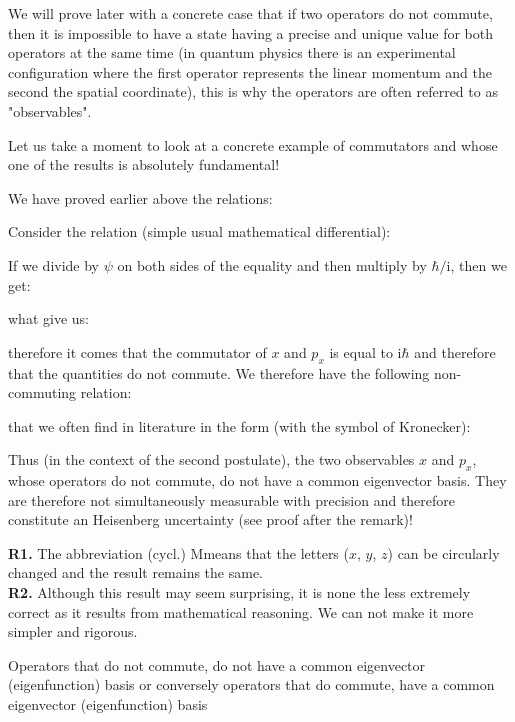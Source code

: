 	We will prove later with a concrete case that if two operators do not commute, then it is impossible to have a state having a precise and unique value for both operators at the same time (in quantum physics there is an experimental configuration where the first operator represents the linear momentum and the second the spatial coordinate), this is why the operators are often referred to as "observables".
	
	Let us take a moment to look at a concrete example of commutators and whose one of the results is absolutely fundamental!

	We have proved earlier above the relations:
	
	Consider the relation (simple usual mathematical differential):
	
	If we divide by $\psi$ on both sides of the equality and then multiply by $\hbar/\mathrm{i}$, then we get:
	
	what give us:
	
	therefore it comes that the commutator of $x$ and $p_x$ is equal to $\mathrm{i}\hbar$ and therefore that the quantities do not commute. We therefore have the following non-commuting relation:
	
	that we often find in literature in the form (with the symbol of Kronecker):
	
	Thus (in the context of the second postulate), the two observables $x$ and $p_x$, whose operators do not commute, do not have a common eigenvector basis. They are therefore not simultaneously measurable with precision and therefore constitute an Heisenberg uncertainty (see proof after the remark)!
	\begin{tcolorbox}[title=Remarks,colframe=black,arc=10pt]
	\textbf{R1.} The abbreviation (cycl.) Mmeans that the letters ($x$, $y$, $z$) can be circularly changed and the result remains the same.\\
	
	\textbf{R2.} Although this result may seem surprising, it is none the less extremely correct as it results from mathematical reasoning. We can not make it more simpler and rigorous.\\
	\end{tcolorbox}
	\begin{theorem}
	Operators that do not commute, do not have a common eigenvector (eigenfunction) basis or conversely operators that do commute, have a common eigenvector (eigenfunction) basis
	\end{theorem}

